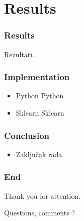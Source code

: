 \documentclass[slidestop,compress,11pt,xcolor=dvipsnames]{beamer}
\begin{document}
\section{Results}

\begin{frame}[fragile] %
\frametitle{Results}

\centerline{Rezultati.}
\end{frame}

\begin{frame}[fragile] %
\frametitle{Implementation}
\vspace{1cm}
\begin{itemize}
\setlength\itemsep{1em}
	\item Python Python
	\item Sklearn Sklearn

\end{itemize}


\end{frame}



\begin{frame}
\frametitle{Conclusion}
\vspace{1.25cm}
\begin{itemize}
\setlength\itemsep{1em}
	\item Zaključak rada. 
\end{itemize}
\end{frame}


\begin{frame}
\vspace{1.25cm}
\frametitle{End}
\centerline{Thank you for attention.}
\vspace{0.5cm}
\centerline{Questions, comments ?}
\end{frame}

\end{document}
